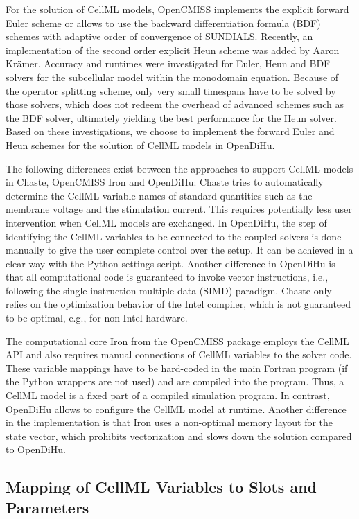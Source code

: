 For the solution of CellML models, OpenCMISS implements the explicit forward Euler scheme or allows to use the backward differentiation formula (BDF) schemes with adaptive order of convergence of SUNDIALS. Recently, an implementation of the second order explicit Heun scheme was added by Aaron Krämer. Accuracy and runtimes were investigated for Euler, Heun and BDF solvers for the subcellular model within the monodomain equation. Because of the operator splitting scheme, only very small timespans have to be solved by those solvers, which does not redeem the overhead of advanced schemes such as the BDF solver, ultimately yielding the best performance for the Heun solver. Based on these investigations, we choose to implement the forward Euler and Heun schemes for the solution of CellML models in OpenDiHu.

The following differences exist between the approaches to support CellML models in Chaste, OpenCMISS Iron and OpenDiHu:
Chaste tries to automatically determine the CellML variable names of standard quantities such as the membrane voltage and the stimulation current. This requires potentially less user intervention when CellML models are exchanged.
In OpenDiHu, the step of identifying the CellML variables to be connected to the coupled solvers is done manually to give the user complete control over the setup. It can be achieved in a clear way with the Python settings script. Another difference in OpenDiHu is that all computational code is guaranteed to invoke vector instructions, i.e., following the single-instruction multiple data (SIMD) paradigm. Chaste only relies on the optimization behavior of the Intel compiler, which is not guaranteed to be optimal, e.g., for non-Intel hardware.

The computational core Iron from the OpenCMISS package employs the CellML API and also requires manual connections of CellML variables to the solver code. These variable mappings have to be hard-coded in the main Fortran program (if the Python wrappers are not used) and are compiled into the program. Thus, a CellML model is a fixed part of a compiled simulation program. In contrast, OpenDiHu allows to configure the CellML model at runtime.
Another difference in the implementation is that Iron uses a non-optimal memory layout for the state vector, which prohibits vectorization and slows down the solution compared to OpenDiHu.

\subsection{Mapping of CellML Variables to Slots and Parameters}

